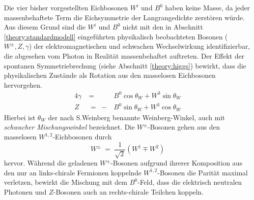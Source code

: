 Die vier bisher vorgestellten Eichbosonen $W^i$ und $B^0$ haben keine Masse, da
jeder massenbehaftete Term die Eichsymmetrie der Langrangedichte zerstören
würde. Aus diesem Grund sind die $W^i$ und $B^0$ nicht mit den in Abschnitt
\ref{theory:standardmodell} eingeführten physikalisch beobachteten Bosonen
($W^\pm, Z, \gamma$) der elektromagnetischen und schwachen Wechselwirkung
identifizierbar, die abgesehen vom Photon in Realität massenbehaftet auftreten.
Der Effekt der spontanen Symmetriebrechung (siehe Abschnitt \ref{theory:higgs})
bewirkt, dass die physikalischen Zustände als Rotation aus den masselosen
Eichbosonen hervorgehen.
\begin{alignat}{4}
    \gamma &\;=\;  &B^0 \cos\theta_W + W^3\sin\theta_W \\
    Z      &\;=\; -&B^0 \sin\theta_W + W^3\cos\theta_W
\end{alignat}
Hierbei ist $\theta_W$ der nach S.Weinberg benannte Weinberg-Winkel, auch mit
\textit{schwacher Mischungswinkel} bezeichnet. Die $W^\pm$-Bosonen gehen aus den
masselosen $W^{1,2}$-Eichbosonen durch
\begin{equation}
    W^\pm \;=\; \frac{1}{\sqrt{2}} \left( W^1 \mp W^2 \right)
\end{equation}
hervor. Während die geladenen $W^\pm$-Bosonen aufgrund ihrerer Komposition aus
den nur an links-chirale Fermionen koppelnde $W^{1,2}$-Bosonen die Parität
maximal verletzen, bewirkt die Mischung mit dem $B^0$-Feld, dass die elektrisch
neutralen Photonen und $Z$-Bosonen auch an rechts-chirale Teilchen koppeln.

